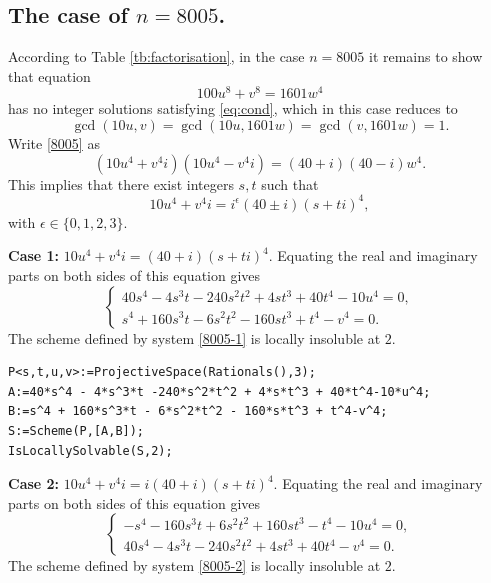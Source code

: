\documentclass[a4paper,12pt,english,reqno]{amsart}
\begin{document}
\subsection{The case of $n=8005$.}%
 According to Table \ref{tb:factorisation}, in the case $n=8005$ it remains to
show that equation
\begin{equation}\label{8005}
100 u^8 + v^8= 1601  w^4
\end{equation}
has no integer solutions satisfying \eqref{eq:cond}, which in this case reduces to \[\gcd(10u,v)=\gcd(10u,1601w)=\gcd(v,1601w)=1.\]
Write \eqref{8005} as 
\begin{equation} (10u^4+v^4i)(10u^4-v^4i)=(40+i)(40-i)w^4.
\end{equation}
This implies that there exist integers $s,t$ such that 
\[10u^4+v^4i=i^{\epsilon}(40\pm i)(s+ti)^4,\]
with $\epsilon \in \{0,1,2,3\}$.


{\bf Case 1:} $10u^4+v^4i=(40+i)(s+ti)^4$. Equating the real and imaginary parts on both sides of this equation gives
\begin{equation}\label{8005-1}
\begin{cases}
40s^4 - 4s^3t - 240s^2t^2 + 4st^3 + 40t^4 - 10u^4=0,\\
s^4 + 160s^3t - 6s^2t^2 - 160st^3 + t^4 - v^4=0.
\end{cases}
\end{equation}
The scheme defined by system \eqref{8005-1} is locally insoluble at $2$.


\begin{lstlisting}
P<s,t,u,v>:=ProjectiveSpace(Rationals(),3);
A:=40*s^4 - 4*s^3*t -240*s^2*t^2 + 4*s*t^3 + 40*t^4-10*u^4;
B:=s^4 + 160*s^3*t - 6*s^2*t^2 - 160*s*t^3 + t^4-v^4;
S:=Scheme(P,[A,B]);
IsLocallySolvable(S,2);
\end{lstlisting}

{\bf Case 2:} $10u^4+v^4i=i(40+i)(s+ti)^4$. Equating the real and imaginary parts on both sides of this equation gives
\begin{equation}\label{8005-2}
\begin{cases}
-s^4 - 160s^3t + 6s^2t^2 + 160st^3 - t^4 - 10u^4=0,\\
40s^4 - 4s^3t - 240s^2t^2 + 4st^3 + 40t^4 - v^4=0.
\end{cases}
\end{equation}
The scheme defined by system \eqref{8005-2} is locally insoluble at $2$.
\end{document}
